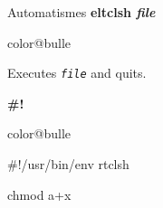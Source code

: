 \documentclass[a4paper,landscape,smooth]{show}
\begin{document}

\begin{tslide}{Automatismes}
   \vfill
   {\bf eltclsh {\em file}}
   \begin{bitemize}{color@bulle}
      \item Executes {\tt\em file} and quits.
   \end{bitemize}
   \vfill
   {\bf \#!}
   \begin{bitemize}{color@bulle}
      \item \#!/usr/bin/env rtclsh
      \item chmod a+x
   \end{bitemize}
   \vfill
\end{tslide}

\vfill\eject\null\vfill\eject
\end{document}
